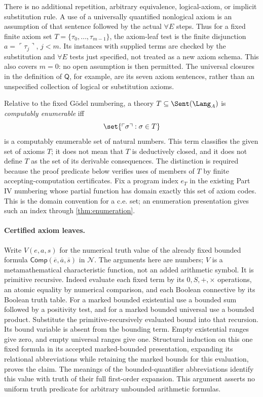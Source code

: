 There is no additional repetition, arbitrary equivalence, logical-axiom,
or implicit substitution rule.  A use of a universally quantified
nonlogical axiom is an assumption of that sentence followed by the actual
\(\forall E\) steps.  Thus for a fixed finite axiom set
\(T=\{\tau_0,\ldots,\tau_{m-1}\}\), the axiom-leaf test is the
finite disjunction \(a=\ulcorner\tau_j\urcorner\), \(j<m\).
Its instances with supplied terms are checked by the substitution and
\(\forall E\) tests just specified, not treated as a new axiom schema.
This also covers \(m=0\): no open assumption is then permitted.  The
universal closures in the definition of \(\mathsf Q\), for example,
are its seven axiom sentences, rather than an unspecified collection of
logical or substitution axioms.

\begin{definition}
Relative to the fixed G\"odel numbering, a theory
\(T\subseteq\Sent(\Lang_A)\) is \emph{computably enumerable} iff
\[
  \set{\ulcorner\sigma\urcorner:\sigma\in T}
\]
is a computably enumerable set of natural numbers.  This term classifies the
given set of axioms \(T\); it does not mean that \(T\) is deductively closed,
and it does not define \(T\) as the set of its derivable consequences.  The
distinction is required because the proof predicate below verifies uses of
members of \(T\) by finite accepting-computation certificates.  Fix a
program index \(e_T\) in the existing Part IV numbering whose partial
function has domain exactly this set of axiom codes.  This is the
domain convention for a c.e. set; an enumeration presentation gives such
an index through \cref{thm:enumeration}.
\end{definition}

\paragraph{Certified axiom leaves.}
Write \(V(e,a,s)\) for the numerical truth value of the already fixed
bounded formula \(\mathsf{Comp}(\overline e,\overline a,\overline s)\)
in \(\mathcal N\).  The arguments here are numbers; \(V\) is a
metamathematical characteristic function, not an added arithmetic symbol.
It is primitive recursive.  Indeed evaluate each fixed term by its
\(0,S,+,\times\) operations, an atomic equality by numerical comparison,
and each Boolean connective by its Boolean truth table.  For a marked
bounded existential use a bounded sum followed by a positivity test, and
for a marked bounded universal use a bounded product.  Substitute the
primitive-recursively evaluated bound into that recursion.  Its bound
variable is absent from the bounding term.  Empty existential ranges give
zero, and empty universal ranges give one.  Structural induction on this
one fixed formula in its accepted marked-bounded presentation, expanding
its relational abbreviations while retaining the marked bounds for this
evaluation, proves the claim.  The meanings of the bounded-quantifier
abbreviations identify this value with truth of their full first-order
expansion.  This argument asserts no uniform truth predicate for
arbitrary unbounded arithmetic formulas.

